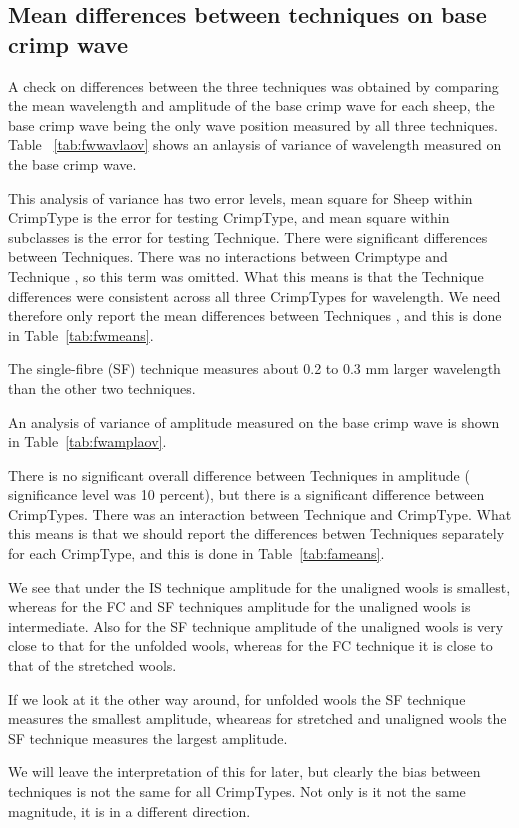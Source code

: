 \documentclass[titlepage,10pt]{article}  %
\begin{document}
\subsection{Mean differences between techniques on base crimp wave}
A check on  differences between the three techniques was obtained by comparing the mean wavelength and amplitude of the base crimp wave for each sheep, the base crimp wave being the only wave position measured by all three techniques. Table ~\ref{tab:fwwavlaov} shows an anlaysis of variance of wavelength measured on the base crimp wave. 

This analysis of variance has two error levels, mean square for Sheep within CrimpType is the error for testing CrimpType, and mean square within subclasses is the error for testing Technique.
There were significant differences between Techniques. There was no interactions between Crimptype and Technique , so this term was omitted. What this means is that the Technique differences were consistent across all three CrimpTypes for wavelength. We need therefore only report the mean differences between Techniques , and this is done in Table~\ref{tab:fwmeans}.

The single-fibre (SF) technique measures about 0.2 to 0.3 mm larger wavelength than the other two techniques.

An analysis of variance of amplitude measured on the base crimp wave is shown in Table~\ref{tab:fwamplaov}.

There is no significant overall difference between Techniques in amplitude ( significance level was 10 percent), but there is a significant difference between CrimpTypes. There was an interaction between Technique and CrimpType. What this means is that we should report the differences betwen Techniques separately for each CrimpType, and this is done in Table~\ref{tab:fameans}. 

We see that under the IS technique amplitude for the unaligned wools is smallest, whereas for the FC and SF techniques amplitude for the unaligned wools is intermediate. Also for the SF technique amplitude of the unaligned wools is very close to that for the unfolded wools, whereas for the FC technique it is close to that of the stretched wools. 

If we look at it the other way around, for unfolded wools the SF technique measures the smallest amplitude, wheareas for stretched and unaligned wools the SF technique measures the largest amplitude. 

We will leave the interpretation of this for later, but clearly the bias between techniques is not the same for all CrimpTypes. Not only is it not the same magnitude, it is in a different direction.
\end{document}
